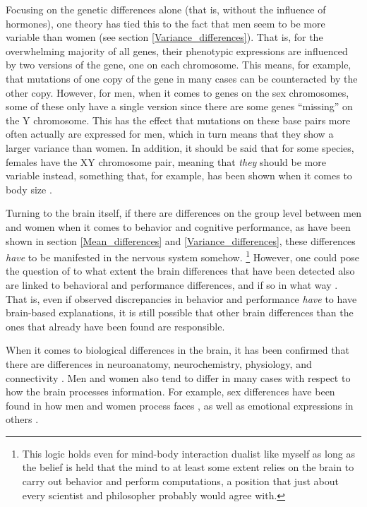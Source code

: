 Focusing on the genetic differences alone (that is, without the influence of hormones), one theory \parencite{Reinhold2013} has tied this to the fact that men seem to be more variable than women (see section \ref{Variance_differences}). That is, for the overwhelming majority of all genes, their phenotypic expressions are influenced by two versions of the gene, one on each chromosome. This means, for example, that mutations of one copy of the gene in many cases can be counteracted by the other copy. However, for men, when it comes to genes on the sex chromosomes, some of these only have a single version since there are some genes ``missing'' on the Y chromosome. This has the effect that mutations on these base pairs more often actually are expressed for men, which in turn means that they show a larger variance than women. In addition, it should be said that for some species, females have the XY chromosome pair, meaning that \emph{they} should be more variable instead, something that, for example, has been shown when it comes to body size \parencite{Reinhold2013}.

Turning to the brain itself, if there are differences on the group level between men and women when it comes to behavior and cognitive performance, as have been shown in section \ref{Mean_differences} and \ref{Variance_differences}, these differences \emph{have} to be manifested in the nervous system somehow. \footnote{This logic holds even for mind-body interaction dualist like myself as long as the belief is held that the mind to at least some extent relies on the brain to carry out behavior and perform computations, a position that just about every scientist and philosopher probably would agree with.} However, one could pose the question of to what extent the brain differences that have been detected also are linked to behavioral and performance differences, and if so in what way \parencite{Grabowska2016,McCarthy2016}. That is, even if observed discrepancies in behavior and performance \emph{have} to have brain-based explanations, it is still possible that other brain differences than the ones that already have been found are responsible.

When it comes to biological differences in the brain, it has been confirmed that there are differences in neuroanatomy, neurochemistry, physiology, and connectivity \parencite{Andreano2009,Tian2011,Ingalhalikar2014}. Men and women also tend to differ in many cases with respect to how the brain processes information. For example, sex differences have been found in how men and women process faces \parencite{Proverbio2017}, as well as emotional expressions in others \parencite{Kret2012}.

